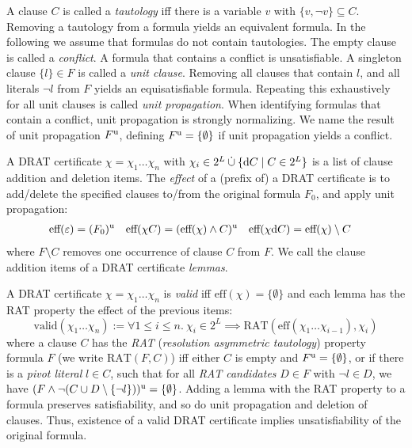 \documentclass{llncs}
\begin{document}
A clause $C$ is called a \emph{tautology} iff there is a variable $v$ with $\{v,\neg v\} \subseteq C$. Removing a tautology from a formula yields an equivalent formula.
In the following we assume that formulas do not contain tautologies.
The empty clause is called a \emph{conflict}. A formula that contains a conflict is unsatisfiable. 
A singleton clause $\{l\} \in F$ is called a \emph{unit clause}. Removing all clauses that contain $l$, and all literals $\neg l$ from $F$ yields an equisatisfiable formula.
Repeating this exhaustively for all unit clauses is called \emph{unit propagation}. When identifying formulas that contain a conflict, unit propagation is strongly normalizing. 
We name the result of unit propagation $F^{\textrm u}$, defining $F^{\textrm u} = \{\emptyset\}$ if unit propagation yields a conflict.

A DRAT certificate $\chi = \chi_1\ldots\chi_n$ with $\chi_i \in 2^L \mathbin{\dot\cup} \{ \textrm d C \mid C\in 2^L \}$
is a list of clause addition and deletion items.
The \emph{effect} of a (prefix of) a DRAT certificate is to add/delete the specified clauses to/from the original formula $F_0$, and apply unit propagation:
\begin{align*}
  \textrm{eff}(\varepsilon) &= (F_0)^\textrm{u}&
  \textrm{eff}(\chi C) &= (\textrm{eff}(\chi) \wedge C)^\textrm{u}&
  \textrm{eff}(\chi\textrm d C) &= \textrm{eff}(\chi) \setminus C
\end{align*}
where $F \setminus C$ removes one occurrence of clause $C$ from $F$. %
We call the clause addition items of a DRAT certificate \emph{lemmas}.

A DRAT certificate $\chi = \chi_1\ldots\chi_n$ is \emph{valid} iff $\textrm{eff}(\chi) = \{\emptyset\}$ and each lemma has the RAT property \wrt the effect of the previous items:
\[
  \textrm{valid}(\chi_1 \ldots \chi_n) := \forall 1\le i\le n.~\chi_i\in2^L \implies\textrm{RAT}( \textrm{eff}(\chi_1\ldots \chi_{i-1}), \chi_i )
\]
where a clause $C$ has the \emph{RAT} (\emph{resolution asymmetric tautology}) property \wrt formula $F$ (we write $\textrm{RAT}(F,C)$) iff either $C$ is empty and $F^{\textrm u}=\{\emptyset\}$,
or if there is a \emph{pivot literal} $l\in C$, such that for all \emph{RAT candidates} $D\in F$ with $\neg l \in D$, we have $(F \wedge \neg(C \cup D\setminus\{\neg l\}))^{\textrm u} = \{\emptyset\}$.
Adding a lemma with the RAT property to a formula preserves satisfiability, and so do unit propagation and deletion of clauses. Thus, existence of a valid DRAT certificate implies unsatisfiability of the original formula.
\end{document}
